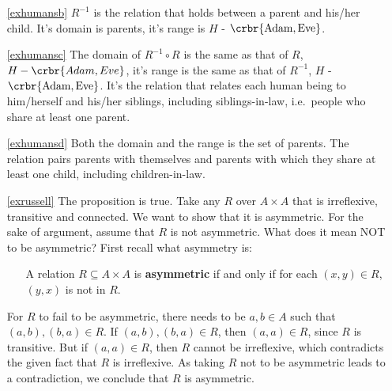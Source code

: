 \documentclass[11pt]{article}
\begin{document}
\begin{enumerate}
\ref{exhumansb} $R^{-1}$ is the relation that holds between a parent and his/her child. It's
domain is parents, it's range is $H$ - $\crbr{\text{Adam},\text{Eve}}$.

\ref{exhumansc} The domain of $R^{-1} \circ R$ is the same as that of $R$, $H -
\crbr{Adam,Eve}$, it's range is the same as that of $R^{-1}$, $H$ -
$\crbr{\text{Adam},\text{Eve}}$. It's the relation that relates each human being
to him/herself and his/her siblings, including siblings-in-law, i.e.\ people who
share at least one parent.

\ref{exhumansd} Both the domain and the range is the set of parents. The relation pairs parents
with themselves and parents with which they share at least one child, including
children-in-law. 

\item[\ref{exrussell}]\hypertarget{exrussellsol}{}
The proposition is true. Take any $R$ over $A\times A$  that is irreflexive,
transitive and connected. We want to show that it is asymmetric. For the sake of
argument, assume that $R$ is not asymmetric. What does it mean NOT to be
asymmetric? First recall what asymmetry is:

\begin{itemize}
\item[] A relation $R\subseteq A\times A$ is \textbf{asymmetric}  if and only if
for each $(x,y) \in R$, $(y,x)$ is not in $R$.
\end{itemize}

For $R$ to fail to be asymmetric, there needs to be $a,b \in A$ such that
$(a,b), (b,a) \in R$. If $(a,b),(b,a)\in R$, then $(a,a)\in R$, since $R$ is
transitive. But if $(a,a)\in R$, then $R$ cannot be irreflexive, which
contradicts the given fact that $R$ is irreflexive. As taking $R$ not to be
asymmetric leads to a contradiction, we conclude that $R$  is asymmetric.


\end{enumerate}
\end{document}
